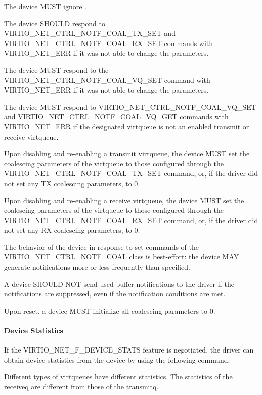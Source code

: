 
The device MUST ignore .

The device SHOULD respond to VIRTIO_NET_CTRL_NOTF_COAL_TX_SET and VIRTIO_NET_CTRL_NOTF_COAL_RX_SET commands with VIRTIO_NET_ERR if it was not able to change the parameters.

The device MUST respond to the VIRTIO_NET_CTRL_NOTF_COAL_VQ_SET command with VIRTIO_NET_ERR if it was not able to change the parameters.

The device MUST respond to VIRTIO_NET_CTRL_NOTF_COAL_VQ_SET and VIRTIO_NET_CTRL_NOTF_COAL_VQ_GET commands with
VIRTIO_NET_ERR if the designated virtqueue is not an enabled transmit or receive virtqueue.

Upon disabling and re-enabling a transmit virtqueue, the device MUST set the coalescing parameters of the virtqueue
to those configured through the VIRTIO_NET_CTRL_NOTF_COAL_TX_SET command, or, if the driver did not set any TX coalescing parameters, to 0.

Upon disabling and re-enabling a receive virtqueue, the device MUST set the coalescing parameters of the virtqueue
to those configured through the VIRTIO_NET_CTRL_NOTF_COAL_RX_SET command, or, if the driver did not set any RX coalescing parameters, to 0.

The behavior of the device in response to set commands of the VIRTIO_NET_CTRL_NOTF_COAL class is best-effort:
the device MAY generate notifications more or less frequently than specified.

A device SHOULD NOT send used buffer notifications to the driver if the notifications are suppressed, even if the notification conditions are met.

Upon reset, a device MUST initialize all coalescing parameters to 0.

\paragraph{Device Statistics}\label{sec:Device Types / Network Device / Device Operation / Control Virtqueue / Device Statistics}

If the VIRTIO_NET_F_DEVICE_STATS feature is negotiated, the driver can obtain
device statistics from the device by using the following command.

Different types of virtqueues have different statistics. The statistics of the
receiveq are different from those of the transmitq.

